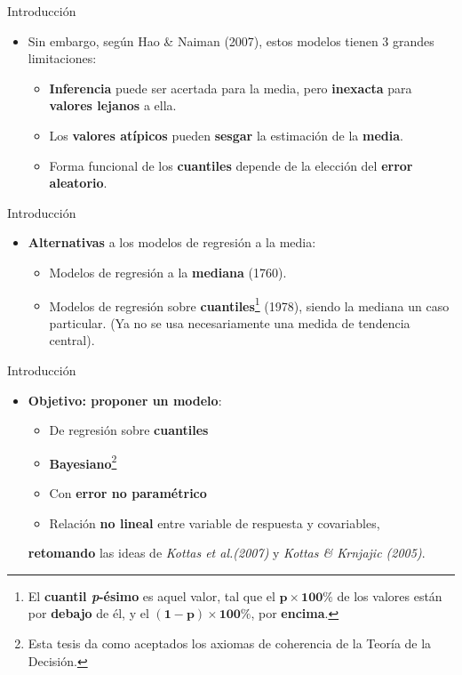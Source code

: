 \documentclass{beamer}
\begin{document}
\begin{frame}{Introducci\'on}{}
  \begin{itemize}
  \setlength\itemsep{2em}
  \item {
    Sin embargo, seg\'un \textit{}Hao \& Naiman (2007), estos modelos tienen 3 grandes limitaciones: 
    \begin{itemize}
        \setlength\itemsep{1em}
        \item {\textbf{Inferencia} puede ser acertada para la media, pero \textbf{inexacta} para \textbf{valores lejanos} a ella.}
        \item{Los \textbf{valores at\'ipicos} pueden \textbf{sesgar} la estimaci\'on de la \textbf{media}.}
        \item{Forma funcional de los \textbf{cuantiles} depende de la elecci\'on del \textbf{error aleatorio}.}
    \end{itemize}
  }
  \end{itemize}
\end{frame}

\begin{frame}{Introducci\'on}{}
  \begin{itemize}
  \setlength\itemsep{2em}
  \item {
    \textbf{Alternativas} a los modelos de regresi\'on a la media: 
    \begin{itemize}
        \setlength\itemsep{1em}
        \item {Modelos de regresi\'on a la \textbf{mediana} (1760).}
        \item {Modelos de regresi\'on sobre \textbf{cuantiles}\footnote{El \textbf{cuantil \textit{p}-\'esimo} es aquel valor, tal que el $\mathbf{p \times 100\%}$ de los valores est\'an por \textbf{debajo} de \'el, y el $\mathbf{(1-p)\times 100\%}$, por \textbf{encima}.} (1978), siendo la mediana un caso particular. (Ya no se usa necesariamente una medida de tendencia central).}
    \end{itemize}
  }
  \end{itemize}
\end{frame}

\begin{frame}{Introducci\'on}{}
  \begin{itemize}
  \setlength\itemsep{2em}
  \item {
    \textbf{Objetivo: proponer un modelo}: 
    \begin{itemize}
        \setlength\itemsep{1em}
        \item {De regresi\'on sobre \textbf{cuantiles}}
        \item{\textbf{Bayesiano}\footnote{Esta tesis da como aceptados los axiomas de coherencia de la Teor\'ia de la Decisi\'on.}}
        \item {Con \textbf{error no param\'etrico}}
        \item {Relaci\'on \textbf{no lineal} entre variable de respuesta y covariables},
    \end{itemize}
    \textbf{retomando} las ideas de \textit{Kottas et al.(2007)} y \textit{Kottas \& Krnjajic (2005)}.
  }
  \end{itemize}
\end{frame}
\end{document}
